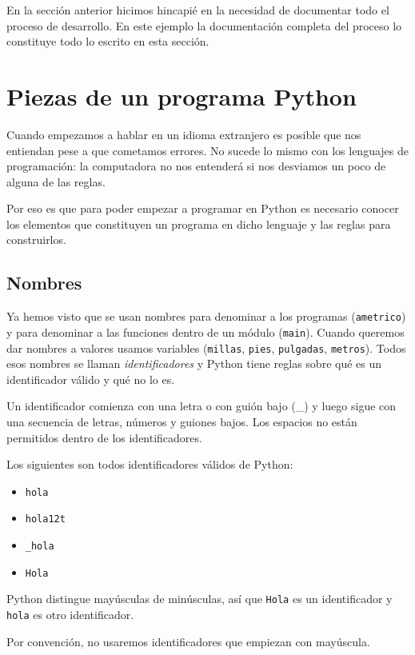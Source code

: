En la sección anterior hicimos hincapié en la necesidad de
documentar todo el proceso de desarrollo. En este ejemplo la
documentación completa del proceso lo constituye todo lo escrito
en esta sección.

\section {Piezas de un programa Python}
Cuando empezamos a hablar en un idioma extranjero es posible que nos entiendan
pese a que cometamos errores. No sucede lo mismo con los lenguajes de
programación: la computadora no nos entenderá si nos desviamos un poco de
alguna de las reglas.

Por eso es que para poder empezar a programar en Python es necesario conocer los elementos
que constituyen un programa en dicho lenguaje y las reglas para construirlos.


\subsection{Nombres}
Ya hemos visto que se usan nombres para denominar a los programas
(\lstinline!ametrico!) y para denominar a las funciones dentro de un
módulo (\lstinline!main!). Cuando queremos dar nombres a valores usamos
variables (\lstinline!millas!, \lstinline!pies!, \lstinline!pulgadas!,
\lstinline!metros!). Todos esos nombres se llaman \emph{identificadores}
y Python tiene reglas sobre qué es un identificador válido y qué
no lo es.

Un identificador comienza con una letra o con guión bajo (\_) y
luego sigue con una secuencia de letras, números y guiones bajos.
Los espacios no están permitidos dentro de los identificadores.

Los siguientes son todos identificadores válidos de Python:

\begin{itemize}[noitemsep]
\item \lstinline!hola!
\item \lstinline!hola12t!
\item \lstinline!_hola!
\item \lstinline!Hola!
\end{itemize}

Python distingue mayúsculas de minúsculas, así que \lstinline!Hola! es
un identificador y \lstinline!hola! es otro identificador.

\begin{observacion}
Por convención, no usaremos identificadores que empiezan con mayúscula.
\end{observacion}

